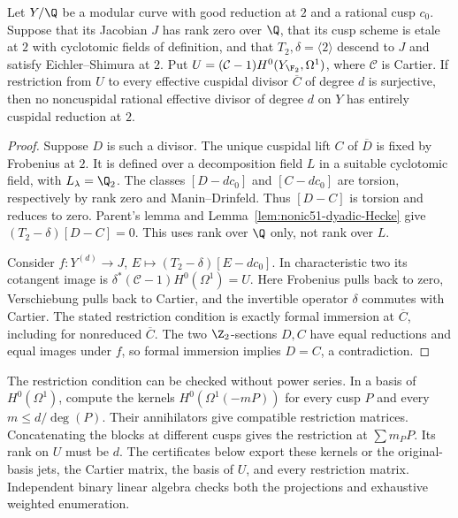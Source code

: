 \begin{lemma}\label{lem:nonic51-quotient-Cartier}
Let $Y/\Q$ be a modular curve with good reduction at $2$ and a
rational cusp $c_0$. Suppose that its Jacobian $J$ has rank zero
over $\Q$, that its cusp scheme is etale at $2$ with cyclotomic
fields of definition, and that $T_2,\delta=\langle2\rangle$ descend
to $J$ and satisfy Eichler--Shimura at $2$.
Put $U=(\mathcal C-1)H^0(Y_{\F_2},\Omega^1)$, where $\mathcal C$
is Cartier. If restriction from $U$ to every effective cuspidal
divisor $\overline C$ of degree $d$ is surjective, then no
noncuspidal rational effective divisor of degree $d$ on $Y$
has entirely cuspidal reduction at $2$.
\end{lemma}
\begin{proof}
Suppose $D$ is such a divisor. The unique cuspidal lift $C$ of
$\overline D$ is fixed by Frobenius at $2$. It is defined over a
decomposition field $L$ in a suitable cyclotomic field, with
$L_\lambda=\Q_2$. The classes $[D-dc_0]$ and $[C-dc_0]$ are
torsion, respectively by rank zero and Manin--Drinfeld.
Thus $[D-C]$ is torsion and reduces to zero. Parent's lemma and
Lemma~\ref{lem:nonic51-dyadic-Hecke} give
$(T_2-\delta)[D-C]=0$.
This uses rank over $\Q$ only, not rank over $L$.

Consider $f:Y^{(d)}\to J$, $E\mapsto(T_2-\delta)[E-dc_0]$.
In characteristic two its cotangent image is
$\delta^*(\mathcal C-1)H^0(\Omega^1)=U$.
Here Frobenius pulls back to zero, Verschiebung pulls back to
Cartier, and the invertible operator $\delta$ commutes with Cartier.
The stated restriction condition is exactly formal immersion at
$\overline C$, including for nonreduced $\overline C$.
The two $\Z_2$-sections $D,C$ have equal reductions and equal
images under $f$, so formal immersion implies $D=C$, a contradiction.
\end{proof}

The restriction condition can be checked without power series.
In a basis of $H^0(\Omega^1)$, compute the kernels
$H^0(\Omega^1(-mP))$ for every cusp $P$ and every
$m\leq d/\deg(P)$. Their annihilators give compatible restriction
matrices. Concatenating the blocks at different cusps gives the
restriction at $\sum m_P P$. Its rank on $U$ must be $d$.
The certificates below export these kernels or the original-basis
jets, the Cartier matrix, the basis of $U$, and every restriction
matrix. Independent binary linear algebra checks both the
projections and exhaustive weighted enumeration.
